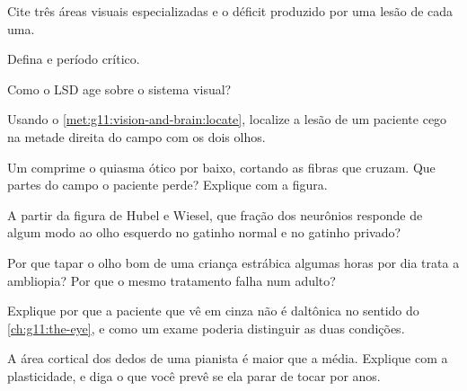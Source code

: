 \begin{exercise}[$\star$]\label{exo:g11:vision-and-brain:3}
Cite três áreas visuais especializadas e o déficit produzido por uma
lesão de cada uma.
\end{exercise}

\begin{exercise}[$\star$]\label{exo:g11:vision-and-brain:4}
Defina  e período crítico.
\end{exercise}

\begin{exercise}[$\star$]\label{exo:g11:vision-and-brain:5}
Como o LSD age sobre o sistema visual?
\end{exercise}

\begin{exercise}[$\star\star$]\label{exo:g11:vision-and-brain:6}
Usando o \cref{met:g11:vision-and-brain:locate}, localize a lesão de um
paciente cego na metade direita do campo com os dois olhos.
\end{exercise}

\begin{exercise}[$\star\star$]\label{exo:g11:vision-and-brain:7}
Um  comprime o quiasma ótico por baixo, cortando as fibras que
cruzam. Que partes do campo o paciente perde? Explique com a figura.
\end{exercise}

\begin{exercise}[$\star\star$]\label{exo:g11:vision-and-brain:8}
A partir da figura de Hubel e Wiesel, que fração dos neurônios responde
de algum modo ao olho esquerdo no gatinho normal e no gatinho privado?
\end{exercise}

\begin{exercise}[$\star\star$]\label{exo:g11:vision-and-brain:9}
Por que tapar o olho bom de uma criança estrábica algumas horas por dia
trata a ambliopia? Por que o mesmo tratamento falha num adulto?
\end{exercise}

\begin{exercise}[$\star\star$]\label{exo:g11:vision-and-brain:10}
Explique por que a paciente que vê em cinza não é daltônica no sentido
do \cref{ch:g11:the-eye}, e como um exame poderia distinguir as duas
condições.
\end{exercise}

\begin{exercise}[$\star\star$]\label{exo:g11:vision-and-brain:11}
A área cortical dos dedos de uma pianista é maior que a média.
Explique com a plasticidade, e diga o que você prevê se ela parar de
tocar por anos.
\end{exercise}

